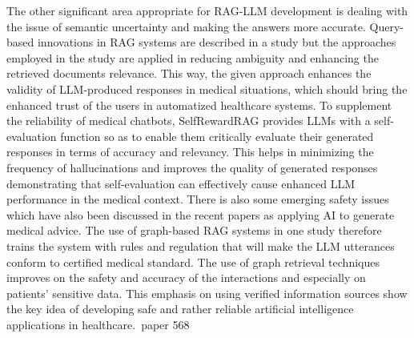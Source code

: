 The other significant area appropriate for RAG-LLM development is dealing with the issue of semantic uncertainty and making the answers more accurate. Query-based innovations in RAG systems are described in a study but the approaches employed in the study are applied in reducing ambiguity and enhancing the retrieved documents relevance. This way, the given approach enhances the validity of LLM-produced responses in medical situations, which should bring the enhanced trust of the users in automatized healthcare systems\cite{yang2024geometryqueriesquerybasedinnovations}. To supplement the reliability of medical chatbots, SelfRewardRAG\cite{10620139} provides LLMs with a self-evaluation function so as to enable them critically evaluate their generated responses in terms of accuracy and relevancy. This helps in minimizing the frequency of hallucinations and improves the quality of generated responses demonstrating that self-evaluation can effectively cause enhanced LLM performance in the medical context. There is also some emerging safety issues which have also been discussed in the recent papers as applying AI to generate medical advice. The use of graph-based RAG systems\cite{wu2024medicalgraphragsafe} in one study therefore trains the system with rules and regulation that will make the LLM utterances conform to certified medical standard. The use of graph retrieval techniques improves on the safety and accuracy of the interactions and especially on patients' sensitive data. This emphasis on using verified information sources show the key idea of developing safe and rather reliable artificial intelligence applications in healthcare.\ paper 568